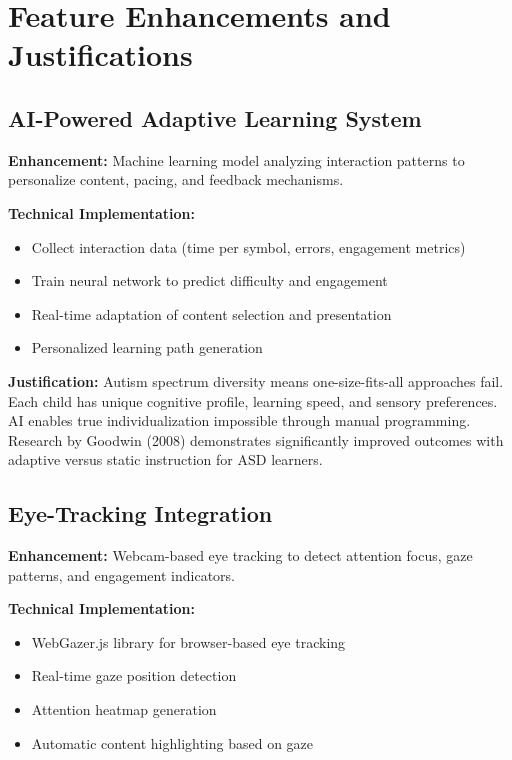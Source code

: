 \documentclass[11pt, a4paper]{article}
\begin{document}
\newpage

\section{Feature Enhancements and Justifications}

\subsection{AI-Powered Adaptive Learning System}

\textbf{Enhancement:} Machine learning model analyzing interaction patterns to personalize content, pacing, and feedback mechanisms.

\textbf{Technical Implementation:}
\begin{itemize}[leftmargin=*, noitemsep]
    \item Collect interaction data (time per symbol, errors, engagement metrics)
    \item Train neural network to predict difficulty and engagement
    \item Real-time adaptation of content selection and presentation
    \item Personalized learning path generation
\end{itemize}

\textbf{Justification:} Autism spectrum diversity means one-size-fits-all approaches fail. Each child has unique cognitive profile, learning speed, and sensory preferences. AI enables true individualization impossible through manual programming. Research by Goodwin (2008) demonstrates significantly improved outcomes with adaptive versus static instruction for ASD learners.

\subsection{Eye-Tracking Integration}

\textbf{Enhancement:} Webcam-based eye tracking to detect attention focus, gaze patterns, and engagement indicators.

\textbf{Technical Implementation:}
\begin{itemize}[leftmargin=*, noitemsep]
    \item WebGazer.js library for browser-based eye tracking
    \item Real-time gaze position detection
    \item Attention heatmap generation
    \item Automatic content highlighting based on gaze
\end{itemize}
\end{document}

